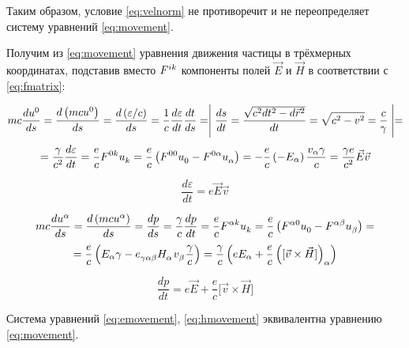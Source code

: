 \documentclass{article}
\begin{document}
Таким образом, условие \eqref{eq:velnorm} не противоречит и не переопределяет систему уравнений \eqref{eq:movement}.

Получим из \eqref{eq:movement} уравнения движения частицы в трёхмерных координатах, подставив вместо $\tensor{F}{^i^k}$ компоненты полей $\vec{E}$ и $\vec{H}$ в соответствии с \eqref{eq:fmatrix}:

\begin{equation*}
    mc\frac{d\tensor{u}{^0}}{ds}=\frac{d\left(mc\tensor{u}{^0}\right)}{ds}=\frac{d\left(\varepsilon/c\right)}{ds}=\frac{1}{c}\frac{d\varepsilon}{dt}\frac{dt}{ds}=\Biggm\lvert\frac{ds}{dt}=\frac{\sqrt{c^2dt^2-d\vec{r}^2}}{dt}=\sqrt{c^2-v^2}=\frac{c}{\gamma}\Biggm\rvert=
\end{equation*}
\begin{equation*}
    =\frac{\gamma}{c^2}\frac{d\varepsilon}{dt}=\frac{e}{c}\tensor{F}{^0^k}\tensor{u}{_k}=\frac{e}{c}\left(\tensor{F}{^0^0}\tensor{u}{_0}-\tensor{F}{^0^\alpha}\tensor{u}{_\alpha}\right)    =-\frac{e}{c}\left(-E_\alpha\right)\frac{v_\alpha\gamma}{c}=\frac{\gamma e}{c^2}\vec{E}\vec{v}
\end{equation*}

\begin{equation}\label{eq:emovement}
    \frac{d\varepsilon}{dt}=e\vec{E}\vec{v}
\end{equation}

\begin{equation*}
    mc\frac{d\tensor{u}{^\alpha}}{ds}=\frac{d\left(mc\tensor{u}{^\alpha}\right)}{ds}=\frac{dp}{ds}=\frac{\gamma}{c}\frac{dp}{dt}=\frac{e}{c}\tensor{F}{^\alpha^k}\tensor{u}{_k}=\frac{e}{c}\left(\tensor{F}{^\alpha^0}\tensor{u}{_0}-\tensor{F}{^\alpha^\beta}\tensor{u}{_\beta}\right)=
\end{equation*}
\begin{equation*}
    =\frac{e}{c}\left(E_\alpha\gamma-\tensor{e}{_\gamma_\alpha_\beta}\tensor{H}{_\alpha}\tensor{v}{_\beta}\frac{\gamma}{c}\right)=\frac{\gamma}{c}\left(eE_\alpha+\frac{e}{c}\left(\lbrack\vec{v}\times\vec{H}\rbrack\right)_\alpha\right)
\end{equation*}

\begin{equation}\label{eq:hmovement}
    \frac{dp}{dt}=e\vec{E}+\frac{e}{c}\lbrack\vec{v}\times\vec{H}\rbrack
\end{equation}

Система уравнений \eqref{eq:emovement}, \eqref{eq:hmovement} эквивалентна уравнению \eqref{eq:movement}.
\end{document}
